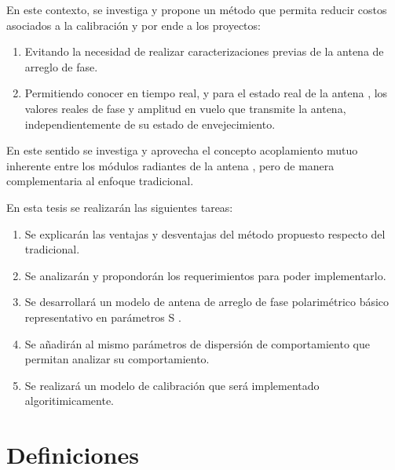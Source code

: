 En este contexto, se investiga y propone un método que permita reducir costos 
asociados a la calibración y por ende a los proyectos:

\begin{enumerate}
    \item Evitando la necesidad de realizar caracterizaciones previas de la 
antena de arreglo de fase.
    \item Permitiendo conocer en tiempo real, y para el estado real de la antena
, los valores reales de fase y amplitud en vuelo que transmite la antena, 
independientemente de su estado de envejecimiento.
\end{enumerate}

En este sentido se investiga y aprovecha el concepto acoplamiento mutuo 
inherente entre los módulos radiantes de la antena \cite{Aumann1989}, pero de
manera complementaria al enfoque tradicional. 

En esta tesis se realizarán las siguientes tareas:

\begin{enumerate}
    \item Se explicarán las ventajas y desventajas del método propuesto respecto del tradicional.
    \item Se analizarán y propondorán los requerimientos para poder implementarlo.
    \item Se desarrollará un modelo de antena de arreglo de fase polarimétrico 
			básico representativo en parámetros S \cite{Caspers}.
    \item Se añadirán al mismo parámetros de dispersión de comportamiento que 
			permitan analizar su comportamiento.
    \item Se realizará un modelo de calibración que será implementado algoritimicamente.
\end{enumerate}


\section{Definiciones}

